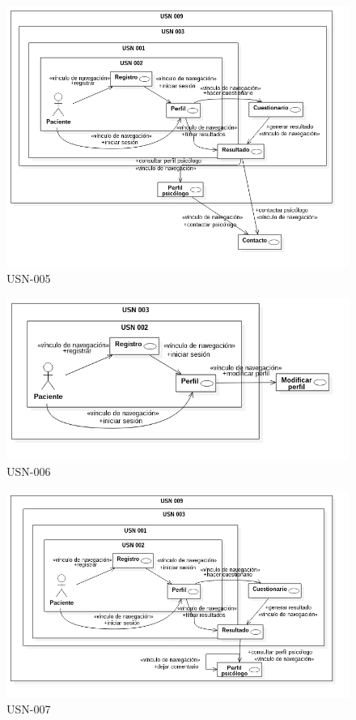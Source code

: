 \begin{figure}[htbp] 
    \centering
    \includegraphics[width=1\textwidth]{figuras/usn/usn005.png}
    \caption{USN-005}
    \label{fig:usn-005}
\end{figure}	

\begin{figure}[htbp] 
    \centering
    \includegraphics[width=1\textwidth]{figuras/usn/usn006.png}
    \caption{USN-006}
    \label{fig:usn-006}
\end{figure}	

\begin{figure}[htbp] 
    \centering
    \includegraphics[width=1\textwidth]{figuras/usn/usn007.png}
    \caption{USN-007}
    \label{fig:usn-007}
\end{figure}	

